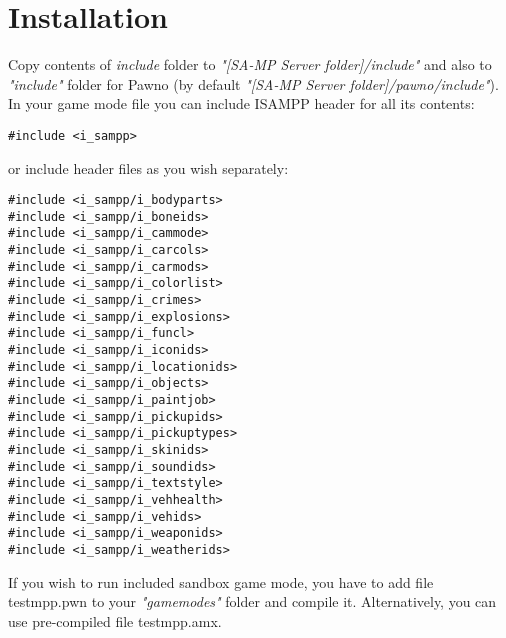 \documentclass{article}
\begin{document}
\section{Installation}
Copy contents of \textit{include} folder to \textit{"[SA-MP Server folder]/include"} and also to \textit{"include"} folder for Pawno (by default \textit{"[SA-MP Server folder]/pawno/include"}).
\\In your game mode file you can include ISAMPP header for all its contents:
\begin{verbatim}
#include <i_sampp>
\end{verbatim}
or include header files as you wish separately:
\begin{verbatim}
#include <i_sampp/i_bodyparts>
#include <i_sampp/i_boneids>
#include <i_sampp/i_cammode>
#include <i_sampp/i_carcols>
#include <i_sampp/i_carmods>
#include <i_sampp/i_colorlist>
#include <i_sampp/i_crimes>
#include <i_sampp/i_explosions>
#include <i_sampp/i_funcl>
#include <i_sampp/i_iconids>
#include <i_sampp/i_locationids>
#include <i_sampp/i_objects>
#include <i_sampp/i_paintjob>
#include <i_sampp/i_pickupids>
#include <i_sampp/i_pickuptypes>
#include <i_sampp/i_skinids>
#include <i_sampp/i_soundids>
#include <i_sampp/i_textstyle>
#include <i_sampp/i_vehhealth>
#include <i_sampp/i_vehids>
#include <i_sampp/i_weaponids>
#include <i_sampp/i_weatherids>
\end{verbatim}
If you wish to run included sandbox game mode, you have to add file testmpp.pwn to your \textit{"gamemodes"} folder and compile it. Alternatively, you can use pre-compiled file testmpp.amx.

\newpage
\end{document}
